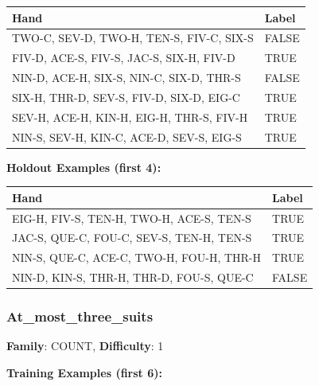 \documentclass[10pt,a4paper]{article}
\begin{document}
\begin{small}
\begin{tabular}{p{8cm}l}
\toprule
Hand & Label \\
\midrule
TWO-C, SEV-D, TWO-H, TEN-S, FIV-C, SIX-S & \textcolor{negative}{FALSE} \\
FIV-D, ACE-S, FIV-S, JAC-S, SIX-H, FIV-D & \textcolor{positive}{TRUE} \\
NIN-D, ACE-H, SIX-S, NIN-C, SIX-D, THR-S & \textcolor{negative}{FALSE} \\
SIX-H, THR-D, SEV-S, FIV-D, SIX-D, EIG-C & \textcolor{positive}{TRUE} \\
SEV-H, ACE-H, KIN-H, EIG-H, THR-S, FIV-H & \textcolor{positive}{TRUE} \\
NIN-S, SEV-H, KIN-C, ACE-D, SEV-S, EIG-S & \textcolor{positive}{TRUE} \\
\bottomrule
\end{tabular}
\end{small}

\textbf{Holdout Examples (first 4):}

\begin{small}
\begin{tabular}{p{8cm}l}
\toprule
Hand & Label \\
\midrule
EIG-H, FIV-S, TEN-H, TWO-H, ACE-S, TEN-S & \textcolor{positive}{TRUE} \\
JAC-S, QUE-C, FOU-C, SEV-S, TEN-H, TEN-S & \textcolor{positive}{TRUE} \\
NIN-S, QUE-C, ACE-C, TWO-H, FOU-H, THR-H & \textcolor{positive}{TRUE} \\
NIN-D, KIN-S, THR-H, THR-D, FOU-S, QUE-C & \textcolor{negative}{FALSE} \\
\bottomrule
\end{tabular}
\end{small}

\vspace{0.5cm}

\subsubsection{At\_most\_three\_suits}

\textbf{Family}: COUNT, \textbf{Difficulty}: 1

\textbf{Training Examples (first 6):}
\end{document}
